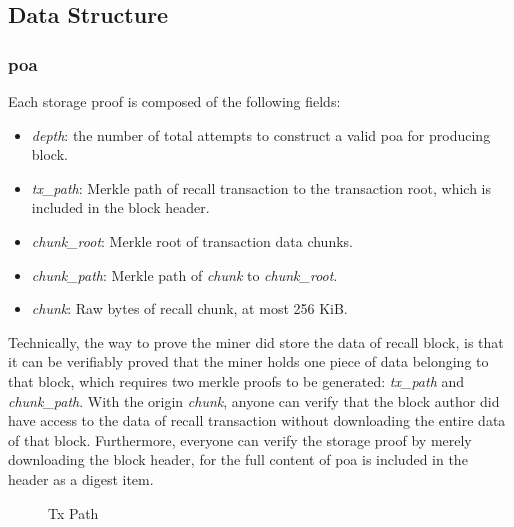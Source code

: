 \documentclass[]{article}
\begin{document}
\subsection{Data Structure}

\subsubsection{poa}\label{poa}

Each storage proof is composed of the following fields:

\begin{itemize}
    \item \textit{depth}: the number of total attempts to construct a valid poa for producing block.
    \item \textit{tx\_path}: Merkle path of recall transaction to the transaction root, which is included in the block header.
    \item \textit{chunk\_root}: Merkle root of transaction data chunks.
    \item \textit{chunk\_path}: Merkle path of \textit{chunk} to \textit{chunk\_root}.
    \item \textit{chunk}: Raw bytes of recall chunk, at most 256 KiB.
\end{itemize}

Technically, the way to prove the miner did store the data of recall block, is that it can be verifiably proved that the miner holds one piece of data belonging to that block, which requires two merkle proofs to be generated: \textit{tx\_path} and \textit{chunk\_path}. With the origin \textit{chunk}, anyone can verify that the block author did have access to the data of recall transaction without downloading the entire data of that block. Furthermore, everyone can verify the storage proof by merely downloading the block header, for the full content of poa is included in the header as a digest item.

\begin{figure}
\caption{Tx Path}
\end{figure}
\end{document}
